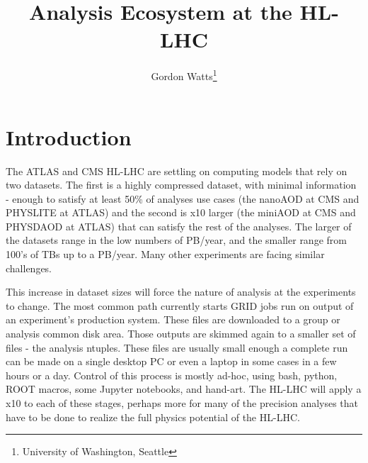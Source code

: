 \documentclass{article}
\title{Analysis Ecosystem at the HL-LHC}
\author{Gordon Watts\footnote{University of Washington, Seattle}}
\begin{document}
\maketitle
{}

\section*{Introduction}

The ATLAS and CMS HL-LHC\cite{hl-lhc} are settling on computing models that rely on two datasets. The first is a highly compressed dataset, with minimal information - enough to satisfy at least 50\% of analyses use cases (the nanoAOD at CMS\cite{hllhc-computing-model} and PHYSLITE at ATLAS\cite{hllhc-computing-model}) and the second is x10 larger (the miniAOD at CMS and PHYSDAOD at ATLAS) that can satisfy the rest of the analyses. The larger of the datasets range in the low numbers of PB/year, and the smaller range from 100's of TBs up to a PB/year. Many other experiments are facing similar challenges.

This increase in dataset sizes will force the nature of analysis at the experiments to change. The most common path currently starts GRID jobs run on output of an experiment's production system. These files are downloaded to a group or analysis common disk area. Those outputs are skimmed again to a smaller set of files - the analysis ntuples. These files are usually small enough a complete run can be made on a single desktop PC or even a laptop in some cases in a few hours or a day. Control of this process is mostly ad-hoc, using bash, python, ROOT\cite{root} macros, some Jupyter notebooks\cite{jupyter}, and hand-art. The HL-LHC will apply a x10 to each of these stages, perhaps more for many of the precision analyses that have to be done to realize the full physics potential of the HL-LHC.
\end{document}
